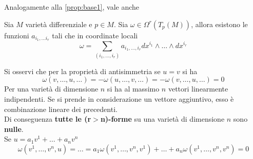 Analogamente alla \ref{prop:base1}, vale anche
\begin{proposition}\label{prop:base2}
   Sia $M$ varietà differenziale e $p \in M$. Sia $\omega \in \Omega^r(T_p(M))$,
   allora esistono le funzioni $a_{i_1,\dots i_r}$ tali che in coordinate locali\\
   $$
      \omega = \sum_{(i_1,\dots, i_r)} a_{i_1,\dots, i_r}
         dx^{i_1} \wedge \dots \wedge dx^{i_r}
   $$
\end{proposition}

Si osservi che per la proprietà di antisimmetria se $u = v$ si ha
$$\omega(v,\dots,u,\dots) = - \omega(u,\dots,v,\dots) = - \omega(v,\dots,u,\dots) = 0$$
Per una varietà di dimensione $n$ si ha al massimo $n$ vettori linearmente indipendenti.
Se si prende in considerazione un vettore aggiuntivo, esso è combinazione lineare dei precedenti.\\
Di conseguenza \textbf{tutte le (r$>$n)-forme} su una varietà di dimensione $n$ sono \textbf{nulle}.\\
Se $u= a_1v^1 + \dots + a_nv^n$
$$
   \omega(v^1,\dots,v^n,u) = \dots = a_1\omega(v^1,\dots,v^n,v^1) + \dots
      + a_n\omega(v^1,\dots,v^n,v^n) = 0
$$

